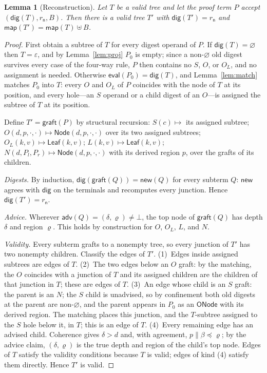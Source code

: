 \documentclass[twocolumn]{article}
\newtheorem{lemma}{Lemma}
\begin{document}
\begin{lemma}[Reconstruction]
\label{lem:graft}
Let $T$ be a valid tree and let the proof term $P$ accept $(\mathsf{dig}(T), r_{\mathsf n}, B)$. Then there is a valid tree $T'$ with $\mathsf{dig}(T') = r_{\mathsf n}$ and $\mathsf{map}(T') = \mathsf{map}(T) \uplus B$.
\end{lemma}
\begin{proof}
First obtain a subtree of $T$ for every digest operand of $P$. If $\mathsf{dig}(T) = \varnothing$ then $T = \varepsilon$, and by Lemma~\ref{lem:proj} $P_0$ is empty; since a non-$\varnothing$ old digest survives every case of the four-way rule, $P$ then contains no $S$, $O$, or $O_L$, and no assignment is needed. Otherwise $\mathsf{eval}(P_0) = \mathsf{dig}(T)$, and Lemma~\ref{lem:match} matches $P_0$ into $T$: every $O$ and $O_L$ of $P$ coincides with the node of $T$ at its position, and every hole---an $S$ operand or a child digest of an $O$---is assigned the subtree of $T$ at its position.

Define $T' = \mathsf{graft}(P)$ by structural recursion: $S(c) \mapsto$ its assigned subtree; $O(d,p,\cdot,\cdot) \mapsto \mathsf{Node}(d,p,\cdot,\cdot)$ over its two assigned subtrees; $O_L(k,v) \mapsto \mathsf{Leaf}(k,v)$; $L(k,v) \mapsto \mathsf{Leaf}(k,v)$; $N(d,P_l,P_r) \mapsto \mathsf{Node}(d,p,\cdot,\cdot)$ with its derived region $p$, over the grafts of its children.

\emph{Digests.} By induction, $\mathsf{dig}(\mathsf{graft}(Q)) = \mathsf{new}(Q)$ for every subterm $Q$: $\mathsf{new}$ agrees with $\mathsf{dig}$ on the terminals and recomputes every junction. Hence $\mathsf{dig}(T') = r_{\mathsf n}$.

\emph{Advice.} Wherever $\mathsf{adv}(Q) = (\delta, \varrho) \neq \bot$, the top node of $\mathsf{graft}(Q)$ has depth $\delta$ and region $\varrho$. This holds by construction for $O$, $O_L$, $L$, and $N$.

\emph{Validity.} Every subterm grafts to a nonempty tree, so every junction of $T'$ has two nonempty children. Classify the edges of $T'$.
(1)~Edges inside assigned subtrees are edges of $T$.
(2)~The two edges below an $O$ graft: by the matching, the $O$ coincides with a junction of $T$ and its assigned children are the children of that junction in $T$; these are edges of $T$.
(3)~An edge whose child is an $S$ graft: the parent is an $N$; the $S$ child is unadvised, so by confinement both old digests at the parent are non-$\varnothing$, and the parent appears in $P_0$ as an $\mathsf{ONode}$ with its derived region. The matching places this junction, and the $T$-subtree assigned to the $S$ hole below it, in $T$; this is an edge of $T$.
(4)~Every remaining edge has an advised child. Coherence gives $\delta > d$ and, with agreement, $p\|\beta \preceq \varrho$; by the advice claim, $(\delta, \varrho)$ is the true depth and region of the child's top node. Edges of $T$ satisfy the validity conditions because $T$ is valid; edges of kind (4) satisfy them directly. Hence $T'$ is valid.


\end{proof}
\end{document}
